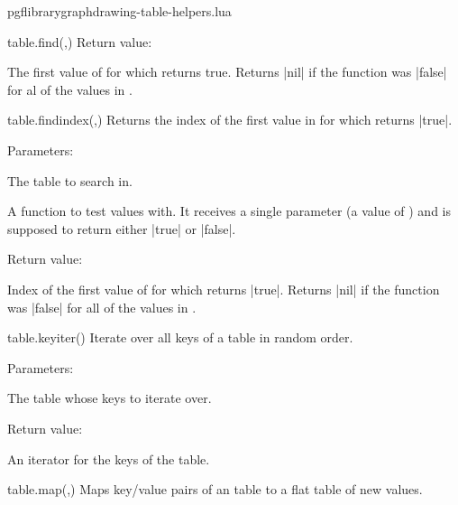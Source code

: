 \begin{filedescription}{pgflibrarygraphdrawing-table-helpers.lua}
\begin{luacommand}{{table.find}(,)}
Return value:
\begin{parameterdescription} 
  \item[] The first value of  for which  returns true. Returns |nil| if the function was |false| for al of the values in . 
\end{parameterdescription}


\end{luacommand}
\begin{luacommand}{{table.find\textunderscore{}index}(,)}
Returns the index of the first value in  for which  returns |true|. 

Parameters:
\begin{parameterdescription}
	\item[\meta{table}] The table to search in.\item[\meta{find\_func}] A function to test values with. It receives a single parameter (a value of ) and is supposed to return either |true| or |false|. 
\end{parameterdescription}


Return value:
\begin{parameterdescription} 
  \item[] Index of the first value of  for which  returns |true|. Returns |nil| if the function was |false| for all of the values in . 
\end{parameterdescription}


\end{luacommand}
\begin{luacommand}{{table.key\textunderscore{}iter}()}
Iterate over all keys of a table in random order. 

Parameters:
\begin{parameterdescription}
	\item[\meta{table}] The table whose keys to iterate over. 
\end{parameterdescription}


Return value:
\begin{parameterdescription} 
  \item[] An iterator for the keys of the table. 
\end{parameterdescription}


\end{luacommand}
\begin{luacommand}{{table.map}(,)}
Maps key/value pairs of an  table to a flat table of new values. 


\end{luacommand}
\end{filedescription}
